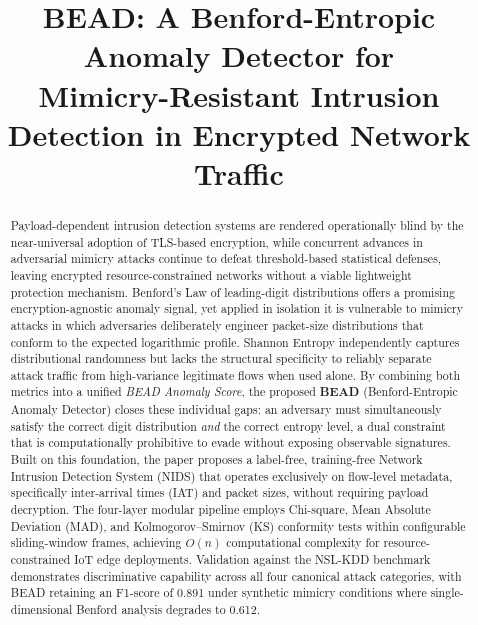 \documentclass[conference]{IEEEtran}
\begin{document}
\title{BEAD: A Benford-Entropic Anomaly Detector for\\
Mimicry-Resistant Intrusion Detection in Encrypted Network Traffic}

\author{%
\and
{}
}

\maketitle

\begin{abstract}
Payload-dependent intrusion detection systems are rendered operationally
blind by the near-universal adoption of TLS-based encryption, while
concurrent advances in adversarial mimicry attacks continue to defeat
threshold-based statistical defenses, leaving encrypted
resource-constrained networks without a viable lightweight protection
mechanism.
Benford's Law of leading-digit distributions offers a promising
encryption-agnostic anomaly signal, yet applied in isolation it is
vulnerable to mimicry attacks in which adversaries deliberately engineer
packet-size distributions that conform to the expected logarithmic profile.
Shannon Entropy independently captures distributional randomness but lacks
the structural specificity to reliably separate attack traffic from
high-variance legitimate flows when used alone.
By combining both metrics into a unified \textit{BEAD Anomaly Score}, the
proposed \textbf{BEAD} (Benford-Entropic Anomaly Detector) closes these individual gaps:
an adversary must simultaneously satisfy the correct digit distribution
\textit{and} the correct entropy level, a dual constraint that is
computationally prohibitive to evade without exposing observable
signatures.
Built on this foundation, the paper proposes a label-free, training-free
Network Intrusion Detection System (NIDS) that operates exclusively on
flow-level metadata, specifically inter-arrival times (IAT) and packet
sizes, without requiring payload decryption.
The four-layer modular pipeline employs Chi-square, Mean Absolute
Deviation (MAD), and Kolmogorov--Smirnov (KS) conformity tests within
configurable sliding-window frames, achieving \(O(n)\) computational
complexity for resource-constrained IoT edge deployments.
Validation against the NSL-KDD benchmark demonstrates discriminative
capability across all four canonical attack categories, with BEAD retaining
an F1-score of 0.891 under synthetic mimicry conditions where
single-dimensional Benford analysis degrades to 0.612.
\end{abstract}
\end{document}
